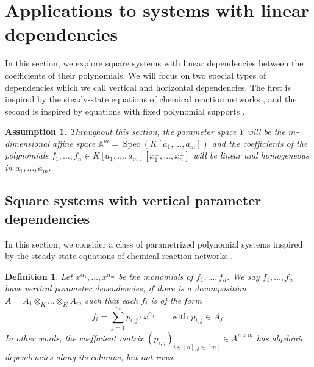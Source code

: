 \documentclass[12pt,reqno,a4paper]{amsart}
\theoremstyle{theoremstyle}
\theoremstyle{examplestyle}
\newtheorem{definition}[theorem]{Definition}
\newtheorem{assumption}[theorem]{Assumption}
\theoremstyle{algorithmstyle}
\DeclareMathOperator{\Spec}{Spec}
\begin{document}
\section{Applications to systems with linear dependencies}\label{sec:linearDependencies}
In this section, we explore square systems with linear dependencies between the coefficients of their polynomials. We will %
focus on two special types of dependencies which we call  vertical and horizontal dependencies. The first is inspired by the steady-state equations of chemical reaction networks \cite{Dickenstein16}, and the second is inspired by equations with fixed polynomial supports \cite{KavehKhovanskii2012}. %

\begin{assumption}\label{ass:SquareSystemsParameterSpace}
  Throughout this section, the parameter space $Y$ will be the $m$-dimensional affine space $\mathbb{A}^{m}=\Spec(K[a_1,\dots,a_m])$  %
  and the coefficients of the polynomials  $f_1,\dots,f_n\in K[a_1,\dots,a_m][x_1^\pm,\dots,x_n^\pm]$ will be linear and homogeneous in  $a_1,\dots,a_m$.
\end{assumption}


\subsection{Square systems with vertical parameter dependencies}\label{sec:verticalDependencies}
In this section, we consider a class of parametrized polynomial systems inspired by the steady-state equations of chemical reaction networks \cite{Dickenstein16}.

\begin{definition}\label{def:verticalDependencies}
  Let $x^{\alpha_1},\dots,x^{\alpha_m}$ be the monomials of $f_1,\dots,f_n$.
  We say $f_1,\dots,f_n$ have \emph{vertical parameter dependencies}, if there is a decomposition $A=A_{1}\otimes_K\dots\otimes_KA_m$ such that each $f_i$ is of the form
  \[ f_i=\sum_{j=1}^m p_{i,j}\cdot x^{\alpha_j} \qquad \text{with } p_{i,j}\in A_j. \]
  In other words, the coefficient matrix $(p_{i,j})_{i\in[n],j\in[m]}\in A^{n\times m}$ has algebraic dependencies along its columns, but not rows.
\end{definition}
\end{document}
